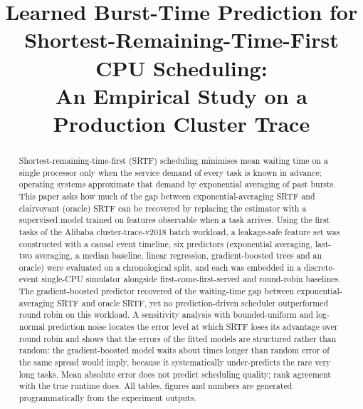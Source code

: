 \documentclass[conference]{IEEEtran}
\begin{document}
\title{Learned Burst-Time Prediction for Shortest-Remaining-Time-First CPU Scheduling:\\
An Empirical Study on a Production Cluster Trace}

\author{
}

\maketitle

\begin{abstract}
Shortest-remaining-time-first (SRTF) scheduling minimises mean waiting time on
a single processor only when the service demand of every task is known in
advance; operating systems approximate that demand by exponential averaging of
past bursts. This paper asks how much of the gap between exponential-averaging
SRTF and clairvoyant (oracle) SRTF can be recovered by replacing the estimator
with a supervised model trained on features observable when a task arrives.
Using the first \nTasks{} tasks of the Alibaba cluster-trace-v2018 batch
workload, a leakage-safe feature set was constructed with a causal event
timeline, six predictors (exponential averaging, last-two averaging, a median
baseline, linear regression, gradient-boosted trees and an oracle) were
evaluated on a chronological split, and each was embedded in a discrete-event
single-CPU simulator alongside first-come-first-served and round-robin
baselines. The gradient-boosted predictor recovered \headline{} of the
waiting-time gap between exponential-averaging SRTF and oracle SRTF, yet no
prediction-driven scheduler outperformed round robin on this workload. A
sensitivity analysis with bounded-uniform and log-normal prediction noise
locates the error level at which SRTF loses its advantage over round robin and
shows that the errors of the fitted models are structured rather than random:
the gradient-boosted model waits about \ratioGBMNoise{} times longer than
random error of the same spread would imply, because it systematically
under-predicts the rare very long tasks. Mean absolute error does not
predict scheduling quality; rank agreement with the true runtime does. All
tables, figures and numbers are generated programmatically from the
experiment outputs.
\end{abstract}
\end{document}
